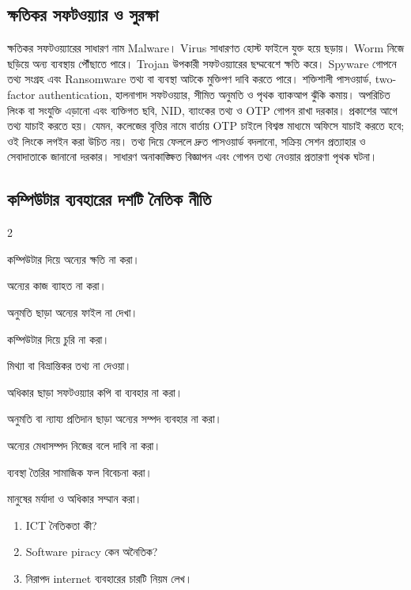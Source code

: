 \subsection{ক্ষতিকর সফটওয়্যার ও সুরক্ষা}
ক্ষতিকর সফটওয়্যারের সাধারণ নাম Malware। Virus সাধারণত হোস্ট ফাইলে যুক্ত হয়ে ছড়ায়। Worm নিজে ছড়িয়ে অন্য ব্যবস্থায় পৌঁছাতে পারে। Trojan উপকারী সফটওয়্যারের ছদ্মবেশে ক্ষতি করে। Spyware গোপনে তথ্য সংগ্রহ এবং Ransomware তথ্য বা ব্যবস্থা আটকে মুক্তিপণ দাবি করতে পারে।
শক্তিশালী পাসওয়ার্ড, two-factor authentication, হালনাগাদ সফটওয়্যার, সীমিত অনুমতি ও পৃথক ব্যাকআপ ঝুঁকি কমায়। অপরিচিত লিংক বা সংযুক্তি এড়ানো এবং ব্যক্তিগত ছবি, NID, ব্যাংকের তথ্য ও OTP গোপন রাখা দরকার। প্রকাশের আগে তথ্য যাচাই করতে হয়।
যেমন, কলেজের বৃত্তির নামে বার্তায় OTP চাইলে বিশ্বস্ত মাধ্যমে অফিসে যাচাই করতে হবে; ওই লিংকে লগইন করা উচিত নয়। তথ্য দিয়ে ফেললে দ্রুত পাসওয়ার্ড বদলানো, সক্রিয় সেশন প্রত্যাহার ও সেবাদাতাকে জানানো দরকার। সাধারণ অনাকাঙ্ক্ষিত বিজ্ঞাপন এবং গোপন তথ্য নেওয়ার প্রতারণা পৃথক ঘটনা।
\subsection{কম্পিউটার ব্যবহারের দশটি নৈতিক নীতি}
\begin{multicols}{2}\begin{compactenum}
\item কম্পিউটার দিয়ে অন্যের ক্ষতি না করা।
\item অন্যের কাজ ব্যাহত না করা।
\item অনুমতি ছাড়া অন্যের ফাইল না দেখা।
\item কম্পিউটার দিয়ে চুরি না করা।
\item মিথ্যা বা বিভ্রান্তিকর তথ্য না দেওয়া।
\item অধিকার ছাড়া সফটওয়্যার কপি বা ব্যবহার না করা।
\item অনুমতি বা ন্যায্য প্রতিদান ছাড়া অন্যের সম্পদ ব্যবহার না করা।
\item অন্যের মেধাসম্পদ নিজের বলে দাবি না করা।
\item ব্যবস্থা তৈরির সামাজিক ফল বিবেচনা করা।
\item মানুষের মর্যাদা ও অধিকার সম্মান করা।
\end{compactenum}\end{multicols}
\begin{practicebox}
\begin{enumerate}
\item ICT নৈতিকতা কী?
\item Software piracy কেন অনৈতিক?
\item নিরাপদ internet ব্যবহারের চারটি নিয়ম লেখ।
\end{enumerate}
\end{practicebox}
